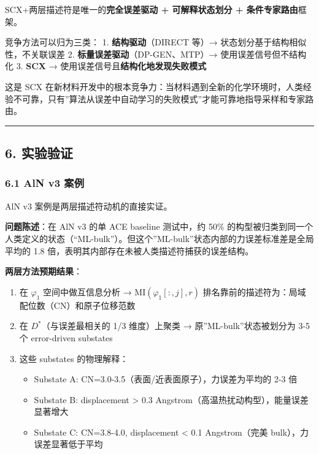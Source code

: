 \documentclass[
  12pt,
]{ctexart}
\providecommand{\tightlist}{%
  \setlength{\itemsep}{0pt}\setlength{\parskip}{0pt}}
\begin{document}
SCX+两层描述符是唯一的\textbf{完全误差驱动 + 可解释状态划分 +
条件专家路由}框架。

竞争方法可以归为三类： 1. \textbf{结构驱动}（DIRECT 等）→
状态划分基于结构相似性，不关联误差 2.
\textbf{标量误差驱动}（DP-GEN、MTP）→ 使用误差信号但不结构化 3.
\textbf{SCX} → 使用误差信号且\textbf{结构化地发现失败模式}

这是 SCX
在新材料开发中的根本竞争力：当材料遇到全新的化学环境时，人类经验不可靠，只有''算法从误差中自动学习的失败模式''才能可靠地指导采样和专家路由。

\begin{center}\rule{0.5\linewidth}{0.5pt}\end{center}

\subsection{6. 实验验证}\label{ux5b9eux9a8cux9a8cux8bc1}

\subsubsection{6.1 AlN v3 案例}\label{aln-v3-ux6848ux4f8b-1}

AlN v3 案例是两层描述符动机的直接实证。

\textbf{问题陈述}：在 AlN v3 的单 ACE baseline 测试中，约 50\%
的构型被归类到同一个人类定义的状态（``ML-bulk''）。但这个''ML-bulk''状态内部的力误差标准差是全局平均的
1.8 倍，表明其内部存在未被人类描述符捕获的误差结构。

\textbf{两层方法预期结果}：

\begin{enumerate}
\def\labelenumi{\arabic{enumi}.}
\tightlist
\item
  在 \(\varphi_1\) 空间中做互信息分析 →
  \(\text{MI}(\varphi_1[:, j], r)\)
  排名靠前的描述符为：局域配位数（CN）和原子位移范数
\item
  在 \(D^*\)（与误差最相关的 1/3 维度）上聚类 →
  原''ML-bulk''状态被划分为 3-5 个 error-driven substates
\item
  这些 substates 的物理解释：

  \begin{itemize}
  \tightlist
  \item
    Substate A: CN=3.0-3.5（表面/近表面原子），力误差为平均的 2-3 倍
  \item
    Substate B: displacement \textgreater{} 0.3
    Angstrom（高温热扰动构型），能量误差显著增大
  \item
    Substate C: CN=3.8-4.0, displacement \textless{} 0.1 Angstrom（完美
    bulk），力误差显著低于平均
  \end{itemize}
\end{enumerate}
\end{document}
